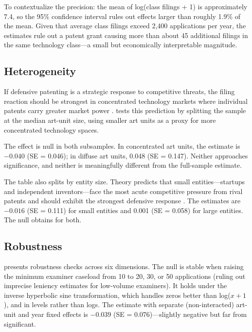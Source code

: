 \documentclass[12pt]{article}
\begin{document}
To contextualize the precision: the mean of log(class filings + 1) is approximately 7.4, so the 95\% confidence interval rules out effects larger than roughly 1.9\% of the mean. Given that average class filings exceed 2,400 applications per year, the estimates rule out a patent grant causing more than about 45 additional filings in the same technology class---a small but economically interpretable magnitude.

\subsection{Heterogeneity}



If defensive patenting is a strategic response to competitive threats, the filing reaction should be strongest in concentrated technology markets where individual patents carry greater market power \citep{shapiro2001, ziedonis2004}.  tests this prediction by splitting the sample at the median art-unit size, using smaller art units as a proxy for more concentrated technology spaces.

The effect is null in both subsamples. In concentrated art units, the estimate is $-0.040$ (SE = 0.046); in diffuse art units, 0.048 (SE = 0.147). Neither approaches significance, and neither is meaningfully different from the full-sample estimate.

The table also splits by entity size. Theory predicts that small entities---startups and independent inventors---face the most acute competitive pressure from rival patents and should exhibit the strongest defensive response \citep{ziedonis2004}. The estimates are $-0.016$ (SE = 0.111) for small entities and 0.001 (SE = 0.058) for large entities. The null obtains for both.

\subsection{Robustness}



 presents robustness checks across six dimensions. The null is stable when raising the minimum examiner caseload from 10 to 20, 30, or 50 applications (ruling out imprecise leniency estimates for low-volume examiners). It holds under the inverse hyperbolic sine transformation, which handles zeros better than log($x + 1$), and in levels rather than logs. The estimate with separate (non-interacted) art-unit and year fixed effects is $-0.039$ (SE = 0.076)---slightly negative but far from significant.
\end{document}
